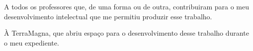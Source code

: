 A todos os professores que, de uma forma ou de outra, contribuiram para o meu desenvolvimento intelectual
que me permitiu produzir esse trabalho.

À TerraMagna, que abriu espaço para o desenvolvimento desse trabalho durante o meu expediente.
